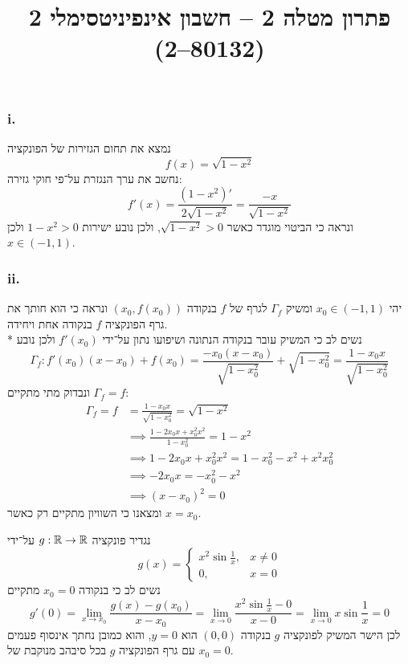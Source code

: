 
\title{פתרון מטלה 2 – חשבון אינפיניטסימלי 2 (80132--2)}


\maketitle
\maketitleprint{}

\Question{}
\Subquestion{}
\subsubsection{i.}
נמצא את תחום הגזירות של הפונקציה
\[
	f(x) = \sqrt{1 - x^2}
\]
נחשב את ערך הנגזרת על־פי חוקי גזירה:
\[
	f'(x) = \frac{(1 - x^2)'}{2 \sqrt{1 - x^2}} = \frac{-x}{\sqrt{1 - x^2}}
\]
ונראה כי הביטוי מוגדר כאשר $\sqrt{1 - x^2} > 0$, ולכן נובע ישירות $1 - x^2 > 0$ ולכן $x \in (-1, 1)$.

\subsubsection{ii.}
יהי $x_0 \in (-1, 1)$ ומשיק $\Gamma_f$ לגרף של $f$ בנקודה $(x_0, f(x_0))$ ונראה כי הוא חותך את גרף הפונקציה $f$ בנקודה אחת ויחידה. \\*
נשים לב כי המשיק עובר בנקודה הנתונה ושיפועו נתון על־ידי $f'(x_0)$ ולכן נובע
\[
	\Gamma_f : f'(x_0)(x - x_0) + f(x_0)
	= \frac{-x_0 (x - x_0)}{\sqrt{1 - x_0^2}} + \sqrt{1 - x_0^2}
	= \frac{1 - x_0 x}{\sqrt{1 - x_0^2}}
\]
ונבדוק מתי מתקיים $\Gamma_f = f$:
\begin{align*}
	\Gamma_f = f
	& = \frac{1 - x_0 x}{\sqrt{1 - x_0^2}} = \sqrt{1 - x^2} \\
	& \implies \frac{1 - 2x_0 x + x_0^2x^2}{1 - x_0^2} = 1 - x^2 \\
	& \implies 1 - 2x_0 x + x_0^2x^2 = 1 - x_0^2 - x^2 + x^2 x_0^2 \\
	& \implies -2x_0 x = -x_0^2 - x^2 \\
	& \implies {(x - x_0)}^2 = 0
\end{align*}
ומצאנו כי השוויון מתקיים רק כאשר $x = x_0$.

\Subquestion{}
נגדיר פונקציה $g : \mathbb{R} \to \mathbb{R}$ על־ידי
\[
	g(x) = \begin{cases}
		x^2 \sin \frac{1}{x}, & x \ne 0 \\
		0, & x = 0
	\end{cases}
\]
נשים לב כי בנקודה $x_0 = 0$ מתקיים
\[
	g'(0)
	= \lim_{x \to x_0} \frac{g(x) - g(x_0)}{x - x_0}
	= \lim_{x \to 0} \frac{x^2 \sin \frac{1}{x} - 0}{x - 0}
	= \lim_{x \to 0} x \sin \frac{1}{x}
	= 0
\]
לכן הישר המשיק לפונקציה $g$ בנקודה $(0, 0)$ הוא $y = 0$, והוא כמובן נחתך אינסוף פעמים עם גרף הפונקציה $g$ בכל סיבהב מנוקבת של $x_0 = 0$.

